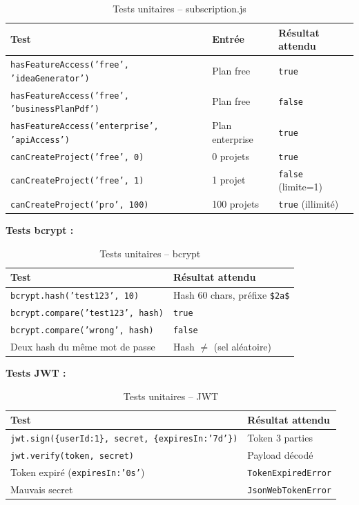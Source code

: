\begin{table}[H]
\centering
\caption{Tests unitaires -- subscription.js}
\label{tab:unit-tests-sub}
\begin{tabular}{|l|l|l|}
\hline
\textbf{Test} & \textbf{Entrée} & \textbf{Résultat attendu} \\
\hline
\texttt{hasFeatureAccess('free', 'ideaGenerator')} & Plan free & \texttt{true} \\
\hline
\texttt{hasFeatureAccess('free', 'businessPlanPdf')} & Plan free & \texttt{false} \\
\hline
\texttt{hasFeatureAccess('enterprise', 'apiAccess')} & Plan enterprise & \texttt{true} \\
\hline
\texttt{canCreateProject('free', 0)} & 0 projets & \texttt{true} \\
\hline
\texttt{canCreateProject('free', 1)} & 1 projet & \texttt{false} (limite=1) \\
\hline
\texttt{canCreateProject('pro', 100)} & 100 projets & \texttt{true} (illimité) \\
\hline
\end{tabular}
\end{table}

\textbf{Tests bcrypt :}

\begin{table}[H]
\centering
\caption{Tests unitaires -- bcrypt}
\label{tab:unit-tests-bcrypt}
\begin{tabular}{|l|l|}
\hline
\textbf{Test} & \textbf{Résultat attendu} \\
\hline
\texttt{bcrypt.hash('test123', 10)} & Hash 60 chars, préfixe \texttt{\$2a\$} \\
\hline
\texttt{bcrypt.compare('test123', hash)} & \texttt{true} \\
\hline
\texttt{bcrypt.compare('wrong', hash)} & \texttt{false} \\
\hline
Deux hash du même mot de passe & Hash $\neq$ (sel aléatoire) \\
\hline
\end{tabular}
\end{table}

\textbf{Tests JWT :}

\begin{table}[H]
\centering
\caption{Tests unitaires -- JWT}
\label{tab:unit-tests-jwt}
\begin{tabular}{|l|l|}
\hline
\textbf{Test} & \textbf{Résultat attendu} \\
\hline
\texttt{jwt.sign(\{userId:1\}, secret, \{expiresIn:'7d'\})} & Token 3 parties \\
\hline
\texttt{jwt.verify(token, secret)} & Payload décodé \\
\hline
Token expiré (\texttt{expiresIn:'0s'}) & \texttt{TokenExpiredError} \\
\hline
Mauvais secret & \texttt{JsonWebTokenError} \\
\hline
\end{tabular}
\end{table}

